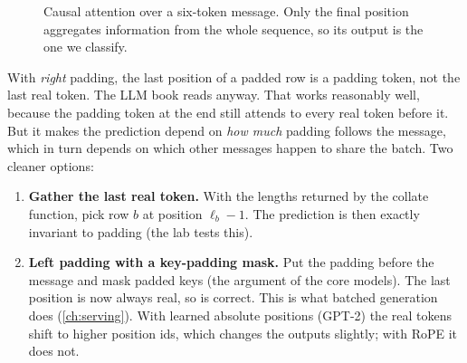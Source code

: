 \begin{figure}[ht]
\centering
{}
\caption{Causal attention over a six-token message. Only the final position aggregates
information from the whole sequence, so its output is the one we classify.}
\label{fig:classify:lasttoken}
\end{figure}

With \emph{right} padding, the last position of a padded row is a padding token, not the
last real token. The LLM book reads  anyway. That works
reasonably well, because the padding token at the end still attends to every real
token before it. But it makes the prediction depend on \emph{how much} padding follows
the message, which in turn depends on which other messages happen to share the batch.
Two cleaner options:

\begin{enumerate}
\item \textbf{Gather the last real token.} With the lengths returned by the collate
function, pick row $b$ at position $\ell_b - 1$. The prediction is then exactly
invariant to padding (the lab tests this).
\item \textbf{Left padding with a key-padding mask.} Put the padding before the message
and mask padded keys (the  argument of the core models). The last
position is now always real, so  is correct. This is what batched
generation does (\cref{ch:serving}). With learned absolute positions (GPT-2) the real
tokens shift to higher position ids, which changes the outputs slightly; with RoPE it
does not.
\end{enumerate}

